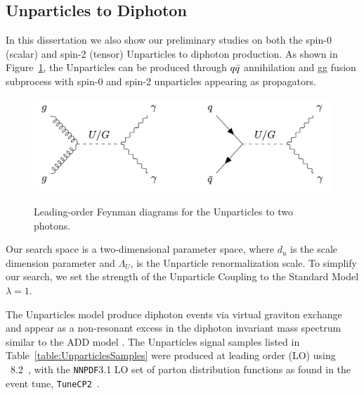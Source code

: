 

\subsection{Unparticles to Diphoton}
In this dissertation we also show our preliminary studies on both the spin-0 (scalar) and spin-2 (tensor) Unparticles to diphoton production. As shown in Figure~\ref{fig:UnparticlesFeynmanDiagram}, the Unparticles can be produced through $q\Bar{q}$ annihilation and gg fusion subprocess with spin-0 and spin-2 unparticles appearing as propagators. 


\begin{figure}[!htbp]
	\caption{Leading-order Feynman diagrams for the Unparticles to two photons.}
	\centering
    \includegraphics[scale=0.4]{fig/Unparticles_Graviton.png}
	\label{fig:UnparticlesFeynmanDiagram}
\end{figure}

Our search space is a two-dimensional parameter space, where $d_u$ is the scale dimension parameter and $\Lambda_{U}$, is the Unparticle renormalization scale. To simplify our search, we set the strength of the Unparticle Coupling to the Standard Model $\lambda = 1$. 

The Unparticles model produce diphoton events via virtual graviton exchange and appear as a non-resonant excess in the diphoton invariant mass spectrum similar to the ADD model \cite{Ask:2009pv}. The Unparticles signal samples listed in Table~\ref{table:UnparticlesSamples} were produced at leading order (LO) using \PYTHIA~8.2~\cite{Sjostrand:2008za},
with the \texttt{NNPDF}3.1 LO set of parton distribution functions as found in the event tune, \texttt{TuneCP2}~\cite{Sirunyan:2019dfx}.

